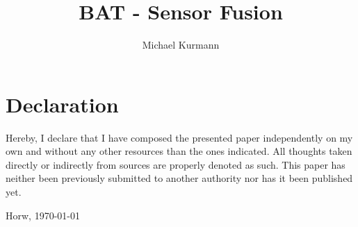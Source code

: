 \documentclass[a4paper, english, 10pt]{report}
\title{BAT - Sensor Fusion}
\author{Michael Kurmann}
\begin{document}

\chapter*{Declaration}
\thispagestyle{empty}
Hereby, I declare that I have composed the presented paper independently on my own and without any other resources than the ones indicated. All thoughts 
taken directly or indirectly from sources are properly denoted as such.
This paper has neither been previously submitted to another authority nor has it been published yet.

\vspace{2cm}
Horw, \today

\begin{abstract}

\end{abstract}
\tableofcontents
\end{document}
